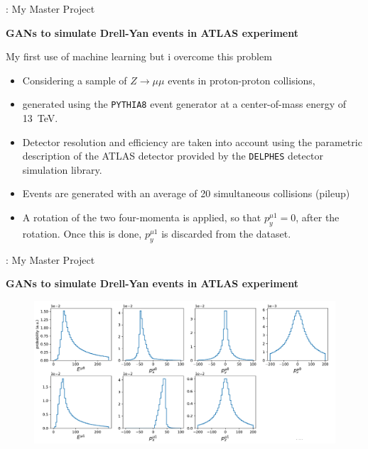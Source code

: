 \documentclass[11pt,aspectratio=169]{beamer}
\begin{document}
\begin{frame}{\underline{\secname} : My Master Project}
	
	
	\begin{center}
		\textbf{GANs to simulate Drell-Yan  events in  ATLAS experiment}
	\end{center}

	My first use of machine learning but i overcome this problem
	
	
		\begin{itemize}			  \setlength\itemsep{0em}
\item
    Considering a sample of $Z \to \mu \mu$ events in proton-proton collisions, 
    \item
    generated using the {\tt PYTHIA8} event generator at a center-of-mass energy of 13~TeV.
    \item
    Detector resolution and efficiency are taken into account using the parametric description of the ATLAS detector provided by the {\tt DELPHES} detector simulation library.
    \item
    Events are generated with an average of 20 simultaneous collisions (pileup)
	\item
	A rotation of the two four-momenta is applied, so that $p_y^{\mu 1}=0$, after the rotation. Once this is done, $p_y^{\mu 1}$ is discarded from the dataset.
			\end{itemize}

	
	\end{frame}

	
	
\begin{frame}{\underline{\secname} : My Master Project}
	
	
	\begin{center}
		\textbf{GANs to simulate Drell-Yan events in  ATLAS experiment}
	\end{center}


\begin{figure}[H]
	\begin{center}
		\includegraphics[width=\textwidth]{slides/pdfresizer.com-pdf-crop}
	\end{center}
\end{figure}
	
 \end{frame}
\end{document}
